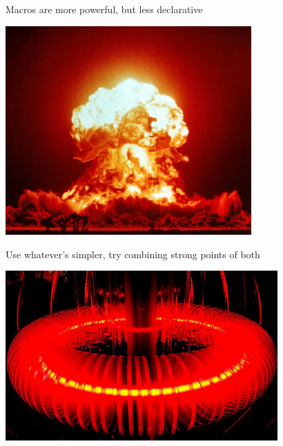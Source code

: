 \documentclass{beamer}
\begin{document}
\begin{frame}[fragile]{Macros are more powerful, but less declarative}
  \begin{center}
    \includegraphics[height=8cm]{img/boom.jpg}
  \end{center}
\end{frame}

\begin{frame}[fragile]{Use whatever's simpler, try combining strong points of both}
  \begin{center}
    \includegraphics[height=6.5cm]{img/fusion.jpg}
  \end{center}
\end{frame}
\end{document}
